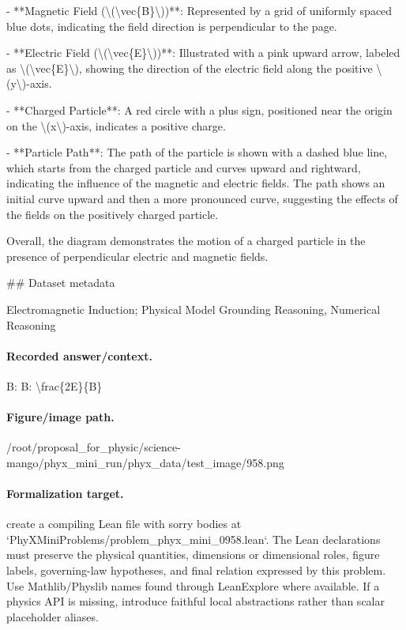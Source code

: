 - **Magnetic Field (\textbackslash{}(\textbackslash{}vec\{B\}\textbackslash{}))**: Represented by a grid of uniformly spaced blue dots, indicating the field direction is perpendicular to the page.

- **Electric Field (\textbackslash{}(\textbackslash{}vec\{E\}\textbackslash{}))**: Illustrated with a pink upward arrow, labeled as \textbackslash{}(\textbackslash{}vec\{E\}\textbackslash{}), showing the direction of the electric field along the positive \textbackslash{}(y\textbackslash{})-axis.

- **Charged Particle**: A red circle with a plus sign, positioned near the origin on the \textbackslash{}(x\textbackslash{})-axis, indicates a positive charge.

- **Particle Path**: The path of the particle is shown with a dashed blue line, which starts from the charged particle and curves upward and rightward, indicating the influence of the magnetic and electric fields. The path shows an initial curve upward and then a more pronounced curve, suggesting the effects of the fields on the positively charged particle.

Overall, the diagram demonstrates the motion of a charged particle in the presence of perpendicular electric and magnetic fields.

\#\# Dataset metadata

Electromagnetic Induction; Physical Model Grounding Reasoning, Numerical Reasoning

\paragraph{Recorded answer/context.}
B: B: \textbackslash{}frac\{2E\}\{B\}

\paragraph{Figure/image path.}
/root/proposal\_for\_physic/science-mango/phyx\_mini\_run/phyx\_data/test\_image/958.png

\paragraph{Formalization target.}
create a compiling Lean file with sorry bodies at `PhyXMiniProblems/problem\_phyx\_mini\_0958.lean`. The Lean declarations must preserve the physical quantities, dimensions or dimensional roles, figure labels, governing-law hypotheses, and final relation expressed by this problem.
Use Mathlib/Physlib names found through LeanExplore where available. If a physics API is missing, introduce faithful local abstractions rather than scalar placeholder aliases.

